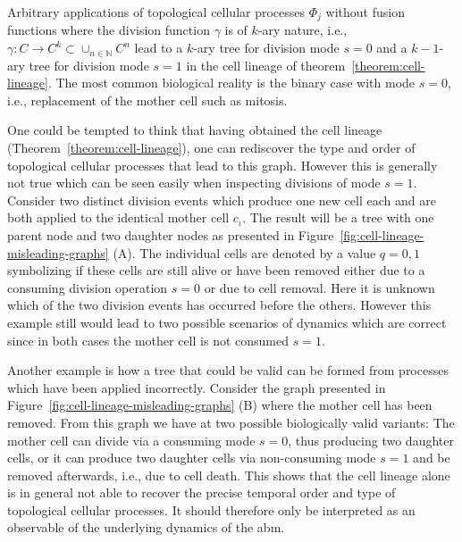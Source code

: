\begin{corollary}
    Arbitrary applications of topological cellular processes $\Phi_j$ without fusion functions where
    the division function $\gamma$ is of $k$-ary nature, i.e.,
    $\gamma:C\rightarrow C^k\subset\cup_{n\in\mathbb{N}}C^n$ lead to a $k$-ary tree for division
    mode $s=0$ and a $k-1$-ary tree for division mode $s=1$ in the cell lineage of
    theorem~\ref{theorem:cell-lineage}.
    The most common biological reality is the binary case with mode $s=0$, i.e., replacement of the
    mother cell such as mitosis.
    \label{corollary:k-ary-division}
\end{corollary}

One could be tempted to think that having obtained the cell lineage
(Theorem~\ref{theorem:cell-lineage}), one can rediscover the type and order of topological cellular
processes that lead to this graph.
However this is generally not true which can be seen easily when inspecting divisions of mode $s=1$.
Consider two distinct division events which produce one new cell each and are both applied to the
identical mother cell $c_\iota$.
The result will be a tree with one parent node and two daughter nodes as presented in
Figure~\ref{fig:cell-lineage-misleading-graphs} (A).
The individual cells are denoted by a value $q=0,1$ symbolizing if these cells are still alive or
have been removed either due to a consuming division operation $s=0$ or due to cell removal.
Here it is unknown which of the two division events has occurred before the others.
However this example still would lead to two possible scenarios of dynamics which are correct since
in both cases the mother cell is not consumed $s=1$.

Another example is how a tree that could be valid can be formed from processes which have been
applied incorrectly.
Consider the graph presented in Figure~\ref{fig:cell-lineage-misleading-graphs} (B) where the mother
cell has been removed.
From this graph we have at two possible biologically valid variants: The mother cell can divide via
a consuming mode $s=0$, thus producing two daughter cells, or it can produce two daughter cells via
non-consuming mode $s=1$ and be removed afterwards, i.e., due to cell death.
This shows that the cell lineage alone is in general not able to recover the precise temporal order
and type of topological cellular processes.
It should therefore only be interpreted as an observable of the underlying dynamics of the \ac{abm}.

